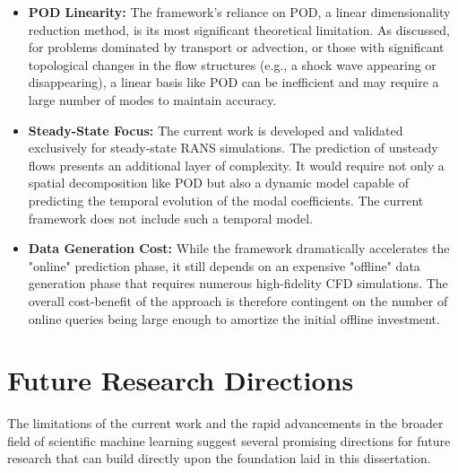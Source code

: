 \documentclass[dsc, EN]{ufabcFHZh}
\begin{document}
\begin{itemize}
    \item \textbf{POD Linearity:} The framework's reliance on POD, a linear dimensionality reduction method, is its most significant theoretical limitation. As discussed, for problems dominated by transport or advection, or those with significant topological changes in the flow structures (e.g., a shock wave appearing or disappearing), a linear basis like POD can be inefficient and may require a large number of modes to maintain accuracy.

    \item \textbf{Steady-State Focus:} The current work is developed and validated exclusively for steady-state RANS simulations. The prediction of unsteady flows presents an additional layer of complexity. It would require not only a spatial decomposition like POD but also a dynamic model capable of predicting the temporal evolution of the modal coefficients. The current framework does not include such a temporal model.

    \item \textbf{Data Generation Cost:} While the framework dramatically accelerates the "online" prediction phase, it still depends on an expensive "offline" data generation phase that requires numerous high-fidelity CFD simulations. The overall cost-benefit of the approach is therefore contingent on the number of online queries being large enough to amortize the initial offline investment.
\end{itemize}

\section{Future Research Directions}

The limitations of the current work and the rapid advancements in the broader field of scientific machine learning suggest several promising directions for future research that can build directly upon the foundation laid in this dissertation.
\end{document}
